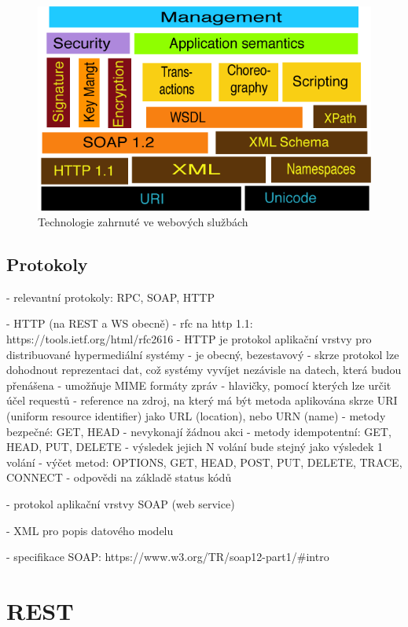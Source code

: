 \documentclass[czech,DP]{thesiskiv}
\begin{document}
\begin{figure}
	\centering
	\includegraphics[width=\linewidth]{ws-tech-stack.png}
	\caption{Technologie zahrnuté ve webových službách}
	\label{fig:ws-tech-stack}	
\end{figure}

\subsection{Protokoly}

- relevantní protokoly: RPC, SOAP, HTTP

- HTTP (na REST a WS obecně)
	- rfc na http 1.1: https://tools.ietf.org/html/rfc2616
	- HTTP je protokol aplikační vrstvy pro distribuované hypermediální systémy
	- je obecný, bezestavový
	- skrze protokol lze dohodnout reprezentaci dat, což systémy vyvíjet nezávisle na datech, která budou přenášena
	- umožňuje MIME formáty zpráv
	- hlavičky, pomocí kterých lze určit účel requestů
	- reference na zdroj, na který má být metoda aplikována skrze URI (uniform resource identifier) jako URL (location), nebo URN (name)
	- metody bezpečné: GET, HEAD - nevykonají žádnou akci
	- metody idempotentní: GET, HEAD, PUT, DELETE - výsledek jejich N volání bude stejný jako výsledek 1 volání
	- výčet metod: OPTIONS, GET, HEAD, POST, PUT, DELETE, TRACE, CONNECT
	- odpovědi na základě status kódů

- protokol aplikační vrstvy SOAP (web service)

- XML pro popis datového modelu

- specifikace SOAP: https://www.w3.org/TR/soap12-part1/\#intro

\section{REST}
\end{document}

